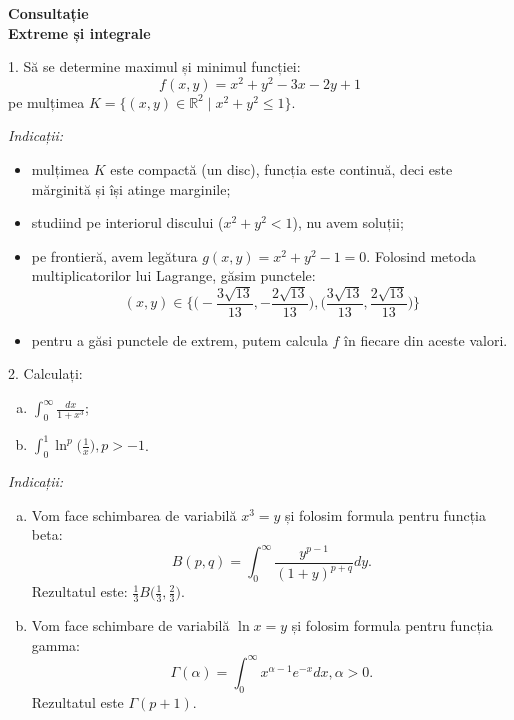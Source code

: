 \documentclass[11pt,a4paper]{article}
\newcommand\ds{\displaystyle}
\newcommand\RR{\mathbb{R}}
\theoremstyle{dotless}
\theoremstyle{dotlessdr}
\begin{document}
\begin{center}
  {\large\textbf{Consultație \\
      Extreme și integrale }}
\end{center}

\vspace{2cm}

1. Să se determine maximul și minimul funcției:
\[
  f(x, y) = x^2 + y^2 - 3x - 2y + 1
\]
pe mulțimea $K = \{ (x, y) \in \RR^2 \mid x^2 + y^2 \leq 1 \}$.

\emph{Indicații:}
\begin{itemize}
\item mulțimea $K$ este compactă (un disc), funcția este continuă, deci
  este mărginită și își atinge marginile;
\item studiind pe interiorul discului ($x^2 + y^2 < 1$), nu avem soluții;
\item pe frontieră, avem legătura $g(x, y) = x^2 + y^2 - 1 = 0$. Folosind metoda
  multiplicatorilor lui Lagrange, găsim punctele:
  \[
    (x, y) \in \Big\{ \Big( -\frac{3\sqrt{13}}{13}, -\frac{2\sqrt{13}}{13} \Big),
    \Big(\frac{3\sqrt{13}}{13}, \frac{2\sqrt{13}}{13}\Big) \Big\}
  \]
\item pentru a găsi punctele de extrem, putem calcula $f$ în fiecare din aceste valori.
\end{itemize}

\vspace{1cm}

2. Calculați:
\begin{enumerate}[(a)]
\item $\ds\int_0^\infty \frac{dx}{1 + x^3}$;
\item $\ds\int_0^1 \ln^p \Big( \frac{1}{x} \Big), p > -1$.
\end{enumerate}

\emph{Indicații:}
\begin{enumerate}[(a)]
\item Vom face schimbarea de variabilă $x^3 = y$ și folosim formula pentru funcția beta:
  \[
    B(p, q) = \int_0^\infty \frac{y^{p-1}}{(1 + y)^{p+q}} dy.
  \]
  Rezultatul este: $\frac{1}{3} B\big( \frac{1}{3}, \frac{2}{3} \big)$.
\item Vom face schimbare de variabilă $\ln x = y$ și folosim formula pentru funcția gamma:
  \[
    \Gamma(\alpha) = \int_0^\infty x^{\alpha - 1} e^{-x} dx, \alpha > 0.
  \]
  Rezultatul este $\Gamma(p + 1)$.
\end{enumerate}

\vspace{1cm}
\end{document}
